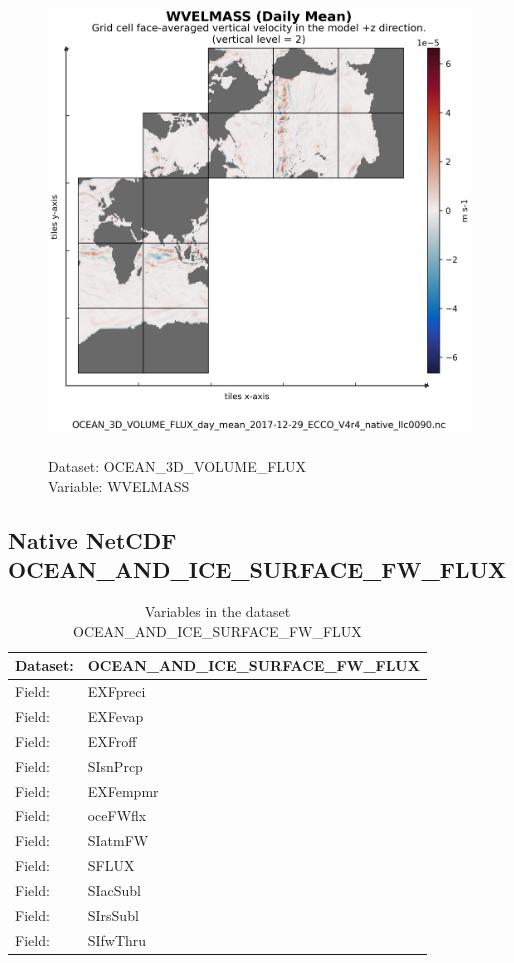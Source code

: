 \begin{figure}[H]
\centering
\includegraphics[scale=0.5]{../images/plots/native_plots/Ocean_Three-Dimensional_Volume_Fluxes/WVELMASS.png}
\caption{\\Dataset: OCEAN\_3D\_VOLUME\_FLUX\\Variable: WVELMASS}
\label{tab:table-OCEAN_3D_VOLUME_FLUX_WVELMASS-Plot}
\end{figure}
\pagebreak
\subsection{Native NetCDF OCEAN\_AND\_ICE\_SURFACE\_FW\_FLUX}
\newp
\begin{longtable}{|p{}|p{}|}
\caption{Variables in the dataset OCEAN\_AND\_ICE\_SURFACE\_FW\_FLUX}
\label{tab:table-OCEAN_AND_ICE_SURFACE_FW_FLUX-fields} \\ 
\hline \endhead \hline \endfoot
\rowcolor{lightgray} \textbf{Dataset:} & \textbf{OCEAN\_AND\_ICE\_SURFACE\_FW\_FLUX} \\ \hline
Field: &EXFpreci \\ \hline
Field: &EXFevap \\ \hline
Field: &EXFroff \\ \hline
Field: &SIsnPrcp \\ \hline
Field: &EXFempmr \\ \hline
Field: &oceFWflx \\ \hline
Field: &SIatmFW \\ \hline
Field: &SFLUX \\ \hline
Field: &SIacSubl \\ \hline
Field: &SIrsSubl \\ \hline
Field: &SIfwThru \\ \hline
\end{longtable}

